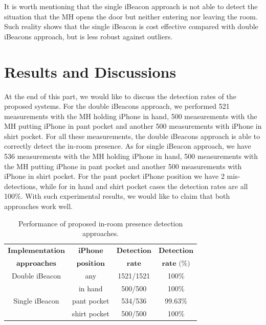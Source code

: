 \documentclass[12pt]{report}
\begin{document}
It is worth mentioning that the single iBeacon approach is not able to detect the situation that the MH opens the door but neither entering nor leaving the room. Such reality shows that the single iBeacon is cost effective compared with double iBeacons approach, but is less robust against outliers.


\section{Results and Discussions}
At the end of this part, we would like to discuss the detection rates of the proposed systems. For the double iBeacons approach, we performed 521 measurements with the MH holding iPhone in hand, 500 measurements with the MH putting iPhone in pant pocket and another 500 measurements with iPhone in shirt pocket. For all these measurements, the double iBeacons approach is able to correctly detect the in-room presence. As for single iBeacon approach, we have 536 measurements with the MH holding iPhone in hand, 500 measurements with the MH putting iPhone in pant pocket and another 500 measurements with iPhone in shirt pocket. For the pant pocket iPhone position we have 2 mis-detections, while for in hand and shirt pocket cases the detection rates are all 100\%. With such experimental results, we would like to claim that both approaches work well.

\begin{table}[!htp]
\begin{center}
\caption{Performance of proposed in-room presence detection approaches.} 
\begin{tabular}[b]{ c || c c c}
	\hline
	\hline
	$\textbf{Implementation}$	& $\textbf{iPhone}$   & $\textbf{Detection}$ & $\textbf{Detection}$\\
	$\textbf{approaches}$ & $\textbf{position}$ & $\textbf{rate}$      & $\textbf{rate (\%)}$\\
  \hline
	Double iBeacon 	& any						& 1521/1521 & 100\% \\
	\hline								
									& in hand 			& 500/500		& 100\% \\
	Single iBeacon	& pant pocket 	& 534/536		& 99.63\% \\
									& shirt pocket	& 500/500		& 100\% \\
	\hline
	\hline
\end{tabular}
\end{center}
\vspace{-6mm}
\end{table}
\end{document}
